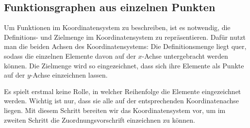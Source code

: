\documentclass[../../main.tex]{subfiles}
\begin{document}
\subsection{Funktionsgraphen aus einzelnen Punkten}
\label{sec:abbildungen_graphen_diskret}


Um Funktionen im Koordinatensystem zu beschreiben, ist es notwendig, die Definitions- und Zielmenge im Koordinatensystem zu repräsentieren. Dafür nutzt man die beiden Achsen des Koordinatensystems: Die Definitionsmenge liegt quer, sodass die einzelnen Elemente davon auf der $x$-Achse untergebracht werden können. Die Zielmenge wird so eingezeichnet, dass sich ihre Elemente als Punkte auf der $y$-Achse einzeichnen lassen.

Es spielt erstmal keine Rolle, in welcher Reihenfolge die Elemente eingezeichnet werden. Wichtig ist nur, dass sie alle auf der entsprechenden Koordinatenachse liegen. Mit diesem Schritt bereiten wir das Koordinatensystem vor, um im zweiten Schritt die Zuordnungsvorschrift einzeichnen zu können.
\end{document}
